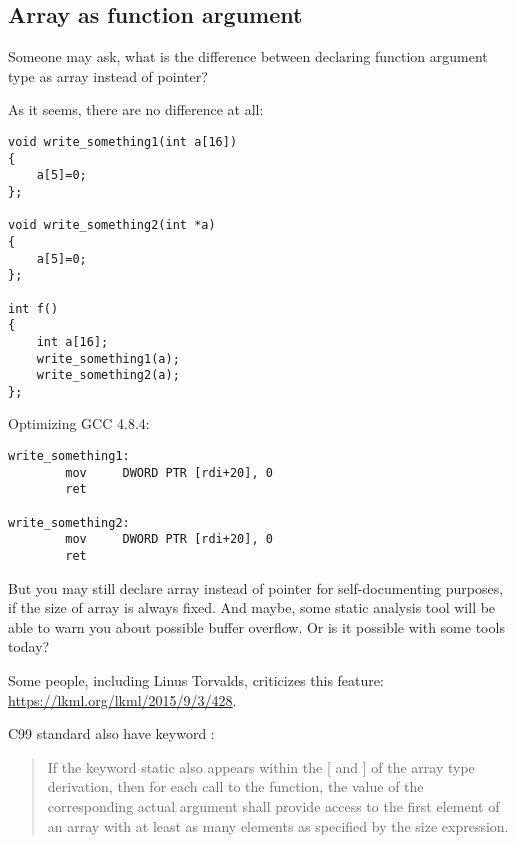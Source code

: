 \subsection{Array as function argument}

Someone may ask, what is the difference between declaring function argument type as array instead of pointer?

As it seems, there are no difference at all:

\begin{lstlisting}[style=customc]
void write_something1(int a[16])
{
	a[5]=0;
};

void write_something2(int *a)
{
	a[5]=0;
};

int f()
{
	int a[16];
	write_something1(a);
	write_something2(a);
};
\end{lstlisting}

Optimizing GCC 4.8.4:

\begin{lstlisting}[style=customasm]
write_something1:
        mov     DWORD PTR [rdi+20], 0
        ret

write_something2:
        mov     DWORD PTR [rdi+20], 0
        ret
\end{lstlisting}

But you may still declare array instead of pointer for self-documenting purposes, if the size of array is always fixed.
And maybe, some static analysis tool will be able to warn you about possible buffer overflow.
Or is it possible with some tools today?

Some people, including Linus Torvalds, criticizes this \CCpp feature: \url{https://lkml.org/lkml/2015/9/3/428}.

C99 standard also have  keyword :

\begin{framed}
\begin{quotation}
If the keyword static also appears  within the [ and ] of the array type derivation, then for each call to the function, the value of the corresponding actual argument shall provide access to the first element of an array with at least as many elements as specified by the size expression.
\end{quotation}
\end{framed}

